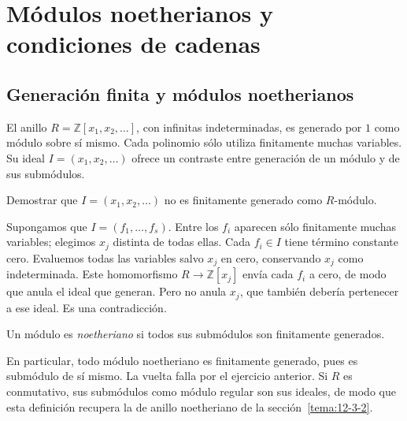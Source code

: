 \section{Módulos noetherianos y condiciones de cadenas}\label{sec:modulos-noetherianos}

\subsection{Generación finita y módulos noetherianos}\label{tema:15-1-1b}\label{tema:15-1-2a}
\begin{ejem}
El anillo $R=\mathbb Z[x_1,x_2,\ldots]$, con infinitas indeterminadas, es generado por $1$ como módulo sobre sí mismo. Cada polinomio sólo utiliza finitamente muchas variables. Su ideal $I=(x_1,x_2,\ldots)$ ofrece un contraste entre generación de un módulo y de sus submódulos.
\end{ejem}

\begin{ejer}\label{ejer:C15-infinitas}
Demostrar que $I=(x_1,x_2,\ldots)$ no es finitamente generado como $R$-módulo.
\end{ejer}
\begin{sol}
Supongamos que $I=(f_1,\ldots,f_s)$. Entre los $f_i$ aparecen sólo finitamente muchas variables; elegimos $x_j$ distinta de todas ellas. Cada $f_i\in I$ tiene término constante cero. Evaluemos todas las variables salvo $x_j$ en cero, conservando $x_j$ como indeterminada. Este homomorfismo $R\to\mathbb Z[x_j]$ envía cada $f_i$ a cero, de modo que anula el ideal que generan. Pero no anula $x_j$, que también debería pertenecer a ese ideal. Es una contradicción.
\end{sol}

\begin{defi}
Un módulo es \emph{noetheriano} si todos sus submódulos son finitamente generados.
\end{defi}
En particular, todo módulo noetheriano es finitamente generado, pues es submódulo de sí mismo. La vuelta falla por el ejercicio anterior. Si $R$ es conmutativo, sus submódulos como módulo regular son sus ideales, de modo que esta definición recupera la de anillo noetheriano de la sección~\ref{tema:12-3-2}.

